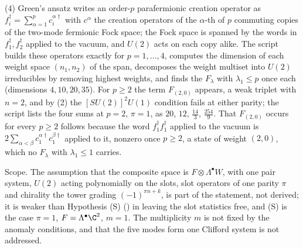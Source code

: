 (4) Green's ansatz writes an order-$p$ parafermionic creation operator as $f_{i}^{\dagger} = \sum_{\alpha = 1}^{p} c_{i}^{\alpha\dagger}$ with $c^{\alpha}$ the creation operators of the $\alpha$-th of $p$ commuting copies of the two-mode fermionic Fock space; the Fock space is spanned by the words in $f_{1}^{\dagger}, f_{2}^{\dagger}$ applied to the vacuum, and $U(2)$ acts on each copy alike. The script builds these operators exactly for $p = 1, \dots, 4$, computes the dimension of each weight space $(n_{1}, n_{2})$ of the span, decomposes the weight multiset into $U(2)$ irreducibles by removing highest weights, and finds the $F_{\lambda}$ with $\lambda_{1} \le p$ once each (dimensions $4, 10, 20, 35$). For $p \ge 2$ the term $F_{(2,0)}$ appears, a weak triplet with $n = 2$, and by (2) the $[SU(2)]^{2}U(1)$ condition fails at either parity; the script lists the four sums at $p = 2$, $\pi = 1$, as $20$, $12$, $\tfrac{14}{3}$, $\tfrac{254}{9}$. That $F_{(2,0)}$ occurs for every $p \ge 2$ follows because the word $f_{1}^{\dagger}f_{1}^{\dagger}$ applied to the vacuum is $2\sum_{\alpha<\beta}c_{1}^{\alpha\dagger}c_{1}^{\beta\dagger}$ applied to it, nonzero once $p \ge 2$, a state of weight $(2, 0)$, which no $F_{\lambda}$ with $\lambda_{1} \le 1$ carries.

Scope. The assumption that the composite space is $F \otimes \Lambda^{\bullet}W$, with one pair system, $U(2)$ acting polynomially on the slots, slot operators of one parity $\pi$ and chirality the tower grading $(-1)^{\pi n + k}$, is part of the statement, not derived; it is weaker than Hypothesis (S) () in leaving the slot statistics free, and (S) is the case $\pi = 1$, $F = \Lambda^{\bullet}\C^{2}$, $m = 1$. The multiplicity $m$ is not fixed by the anomaly conditions, and that the five modes form one Clifford system is not addressed.

